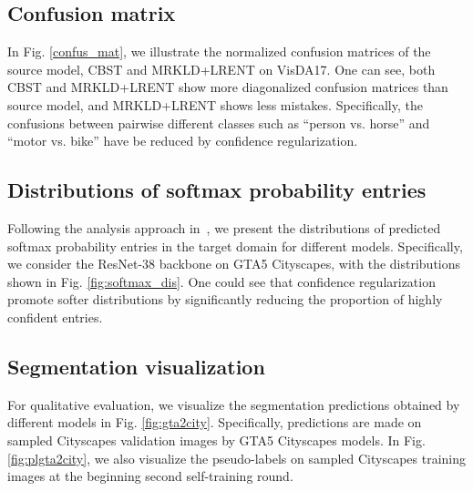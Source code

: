 \documentclass[10pt,twocolumn,letterpaper]{article}
\theoremstyle{plain}
\begin{document}
\subsection{Confusion matrix}
In Fig. \ref{confus_mat}, we illustrate the normalized confusion matrices of the source model, CBST and MRKLD+LRENT on VisDA17. One can see, both CBST and MRKLD+LRENT show more diagonalized confusion matrices than source model, and MRKLD+LRENT shows less mistakes. Specifically, the confusions between pairwise different classes such as ``person vs. horse'' and ``motor vs. bike'' have be reduced by confidence regularization.

\subsection{Distributions of softmax probability entries}
Following the analysis approach in~\cite{pereyra2017regularizing}, we present the distributions of predicted softmax probability entries in the target domain for different models. Specifically, we consider the ResNet-38 backbone on GTA5  Cityscapes, with the distributions shown in Fig. \ref{fig:softmax_dis}. One could see that confidence regularization promote softer distributions by significantly reducing the proportion of highly confident entries.

\subsection{Segmentation visualization}
For qualitative evaluation, we visualize the segmentation predictions obtained by different models in Fig. \ref{fig:gta2city}. Specifically, predictions are made on sampled Cityscapes validation images by GTA5  Cityscapes models. In Fig. \ref{fig:plgta2city}, we also visualize the pseudo-labels on sampled Cityscapes training images at the beginning second self-training round.
\end{document}
